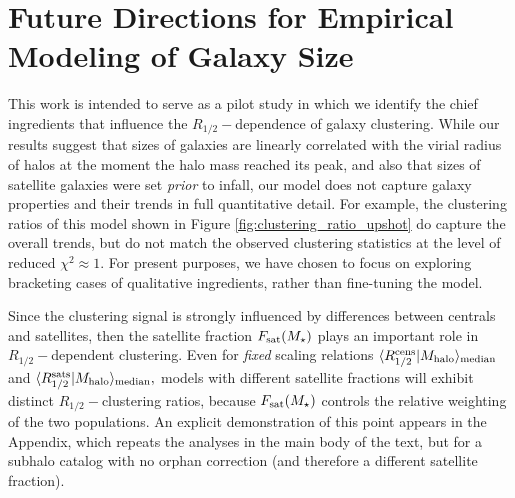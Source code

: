 \documentclass[usenatbib,usegraphicx,letterpaper]{mn2e}
\newcommand{\rhalf}{R_{1/2}}
\newcommand{\mstar}{M_{\star}}
\newcommand{\mhalo}{M_{\rm halo}}
\newcommand{\median}[2]{\langle{#1}\vert{#2}\rangle_{\rm median}}
\begin{document}
\section{Future Directions for Empirical Modeling of Galaxy Size}
\label{sec:future}

This work is intended to serve as a pilot study in which we identify the chief ingredients that influence the $\rhalf-$dependence of galaxy clustering. While our results suggest that sizes of galaxies are linearly correlated with the
virial radius of halos at the moment the halo mass reached its peak, and also that sizes of satellite galaxies were set {\em prior} to infall, our model does not capture galaxy properties and their trends in full quantitative detail.
For example, the clustering ratios of this model shown in Figure \ref{fig:clustering_ratio_upshot} do capture the overall trends, but do not match the observed clustering statistics at the level of reduced $\chi^2\approx 1.$ For present purposes, we have chosen to focus on exploring bracketing cases of qualitative ingredients, rather than fine-tuning the model.

Since the clustering signal is strongly influenced by differences between centrals and satellites, then the satellite fraction $F_{\rm sat}(\mstar)$ plays an important role in $\rhalf-$dependent clustering. Even for {\em fixed} scaling relations $\median{\rhalf^{\rm cens}}{\mhalo}$ and $\median{\rhalf^{\rm sats}}{\mhalo},$ models with different satellite fractions will exhibit distinct $\rhalf-$clustering ratios, because $F_{\rm sat}(\mstar)$ controls the relative weighting of the two populations. An explicit demonstration of this point appears in the Appendix, which repeats the analyses in the main body of the text, but for a subhalo catalog with no orphan correction (and therefore a different satellite fraction).
\end{document}
